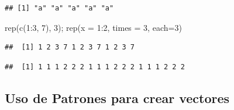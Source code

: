 \documentclass[
]{book}
\newenvironment{Shaded}{\begin{snugshade}}{\end{snugshade}}
\newcommand{\AttributeTok}[1]{\textcolor[rgb]{0.77,0.63,0.00}{#1}}
\newcommand{\DecValTok}[1]{\textcolor[rgb]{0.00,0.00,0.81}{#1}}
\newcommand{\FunctionTok}[1]{\textcolor[rgb]{0.00,0.00,0.00}{#1}}
\newcommand{\NormalTok}[1]{#1}
\newcommand{\SpecialCharTok}[1]{\textcolor[rgb]{0.00,0.00,0.00}{#1}}
\begin{document}
\begin{verbatim}
## [1] "a" "a" "a" "a" "a"
\end{verbatim}

\small

\begin{Shaded}
\begin{Highlighting}[]
\FunctionTok{rep}\NormalTok{(}\FunctionTok{c}\NormalTok{(}\DecValTok{1}\SpecialCharTok{:}\DecValTok{3}\NormalTok{, }\DecValTok{7}\NormalTok{), }\DecValTok{3}\NormalTok{); }\FunctionTok{rep}\NormalTok{(}\AttributeTok{x =} \DecValTok{1}\SpecialCharTok{:}\DecValTok{2}\NormalTok{, }\AttributeTok{times =} \DecValTok{3}\NormalTok{, }\AttributeTok{each=}\DecValTok{3}\NormalTok{)}
\end{Highlighting}
\end{Shaded}

\begin{verbatim}
##  [1] 1 2 3 7 1 2 3 7 1 2 3 7
\end{verbatim}

\begin{verbatim}
##  [1] 1 1 1 2 2 2 1 1 1 2 2 2 1 1 1 2 2 2
\end{verbatim}

\normalsize

\hypertarget{uso-pat}{%
\subsection{\texorpdfstring{Uso de \textbf{Patrones} para crear vectores}{Uso de Patrones para crear vectores}}\label{uso-pat}}
\end{document}
